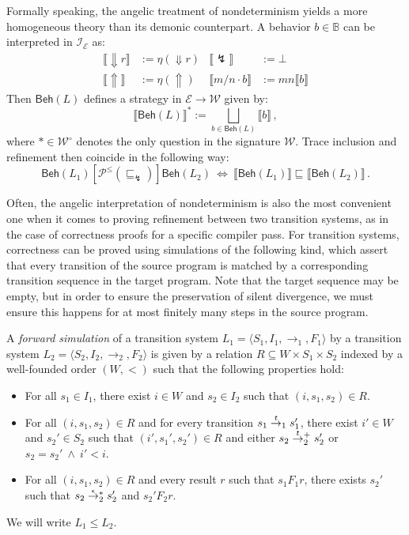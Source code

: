 \documentclass[sigplan,10pt,review,anonymous]{acmart}
\newcommand{\kw}[1]{\ensuremath{ \mathsf{#1} }}
\newcommand{\refby}{\sqsubseteq}
\newcommand{\que}{{\circ}}
\newcommand{\ifr}[1]{\mathrel{[{#1}]}}
\begin{document}
Formally speaking,
the angelic treatment of nondeterminism
yields a more homogeneous theory
than its demonic counterpart.
A behavior $b \in \mathbb{B}$ can be interpreted
in $\mathcal{I}_\mathcal{E}$ as:
\begin{align*}
  \llbracket {\Downarrow}r \rrbracket &:= \eta({\Downarrow} r) &
  \llbracket {\lightning} \rrbracket &:= \bot \\
  \llbracket {\Uparrow} \rrbracket &:= \eta({\Uparrow}) &
  \llbracket m / n \cdot b \rrbracket &:=
    m n \llbracket b \rrbracket
\end{align*}
Then $\kw{Beh}(L)$ defines a strategy
in $\mathcal{E} \rightarrow \mathcal{W}$ given by:
\[
  \llbracket \kw{Beh}(L) \rrbracket^* :=
    \bigsqcup_{b \in \kw{Beh}(L)} \llbracket b \rrbracket
  \,,
\]
where $* \in \mathcal{W}^\que$ denotes the only question
in the signature $\mathcal{W}$.
Trace inclusion and refinement then
coincide in the following way:
\[
  \kw{Beh}(L_1)
  \ifr{\mathcal{P}^\le({\refby_\lightning})}
  \kw{Beh}(L_2)
  \: \Leftrightarrow \:
  \llbracket \kw{Beh}(L_1) \rrbracket
  \refby
  \llbracket \kw{Beh}(L_2) \rrbracket
  \,.
\]

Often,
the angelic interpretation of nondeterminism
is also the most convenient one
when it comes to proving refinement between
two transition systems,
as in the case of correctness proofs for
a specific compiler pass.
For transition systems,
correctness can be proved using simulations of the following kind,
which assert that every transition of the source program
is matched by a corresponding transition sequence in the target program.
Note that the target sequence may be empty,
but in order to ensure the preservation of silent divergence,
we must ensure this happens for at most
finitely many steps in the source program.

\begin{definition}
A \emph{forward simulation}
of a transition system
$L_1 = \langle S_1, I_1, {\rightarrow}_1, F_1 \rangle$
by a transition system
$L_2 = \langle S_2, I_2, {\rightarrow}_2, F_2 \rangle$
is given by a relation $R \subseteq W \times S_1 \times S_2$
indexed by a well-founded order $(W, {<})$
such that the following properties hold:
\begin{itemize}
  \item For all $s_1 \in I_1$,
    there exist $i \in W$ and $s_2 \in I_2$
    such that $(i, s_1, s_2) \in R$.
  \item For all $(i, s_1, s_2) \in R$
    and for every transition
    $s_1 \mathrel{\smash{\stackrel{t}{\rightarrow}}_1} s_1'$,
    there exist $i' \in W$ and $s_2' \in S_2$
    such that $(i', s_1', s_2') \in R$ and either
    $s_2 \mathrel{\smash{\stackrel{t}{\rightarrow}}_2^+} s_2'$ or
    $s_2 = s_2' \:\wedge\: i' < i$.
  \item For all $(i, s_1, s_2) \in R$
    and every result $r$ such that $s_1 \mathrel{F_1} r$,
    there exists $s_2'$ such that
    $s_2 \mathrel{\smash{\stackrel{\epsilon}{\rightarrow}}_2^*} s_2'$ and
    $s_2' \mathrel{F_2} r$.
\end{itemize}
We will write $L_1 \le L_2$.
\end{definition}
\end{document}
